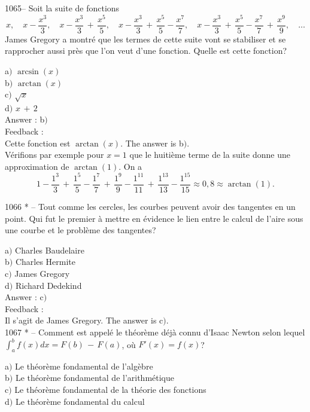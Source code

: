 \documentclass[letterpaper, 12pt]{article}
\begin{document}
1065-- Soit la suite de fonctions
$$\displaystyle{x,\quad x-\frac{x^3}3,\quad
x-\frac{x^3}3\,+\,\frac{x^5}5,\quad
x-\frac{x^3}3\,+\,\frac{x^5}5-\frac{x^7}7,\quad
x-\frac{x^3}3\,+\,\frac{x^5}5-\frac{x^7}7\,+\,\frac{x^9}9,\quad\ldots}$$
James Gregory a montr\'e que les termes de cette suite vont se
stabiliser et se rapprocher aussi pr\`es que l'on veut d'une
fonction. Quelle est cette fonction?

a$)$ $\arcsin(x)$ \\
b$)$ $\arctan(x)$  \\
c$)$ $\sqrt x$  \\
d$)$ $x\,+\,2$\\

Answer : b$)$\\

Feedback : \\
Cette fonction est $\arctan(x)$. The answer is b$)$.\\
V\'erifions par exemple pour $x=1$ que le huiti\`eme terme de la
suite donne une approximation de $\arctan(1)$. On a
$$1-\frac{1^3}3\,+\,\frac{1^5}5-\frac{1^7}7\,+\,\frac{1^9}9-\frac{1^{11}}{11}\,+\,\frac{1^{13}}{13}-\frac{1^{15}}{15}\approx0,8\approx\arctan(1).$$


1066 * -- Tout comme les cercles, les courbes peuvent avoir des
tangentes en un point. Qui fut le premier \`a mettre en \'evidence
le lien entre le calcul de l'aire sous une courbe et le probl\`eme
des tangentes?

a$)$ Charles Baudelaire \\
b$)$ Charles Hermite \\
c$)$ James Gregory  \\
d$)$ Richard Dedekind \\

Answer : c$)$ \\

Feedback : \\
Il s'agit de James Gregory.
The answer is c$)$.\\

1067 * -- Comment est appel\'e le th\'eor\`eme d\'ej\`a connu
d'Isaac Newton selon lequel $\int_a^bf(x)dx=F(b)\,-\,F(a)$, o\`u
$F'(x)=f(x)$?

a$)$ Le th\'eor\`eme fondamental de l'alg\`ebre \\
b$)$ Le th\'eor\`eme fondamental de l'arithm\'etique  \\
c$)$ Le th\'eor\`eme fondamental de la th\'eorie des fonctions  \\
d$)$ Le th\'eor\`eme fondamental du calcul\\
\end{document}
